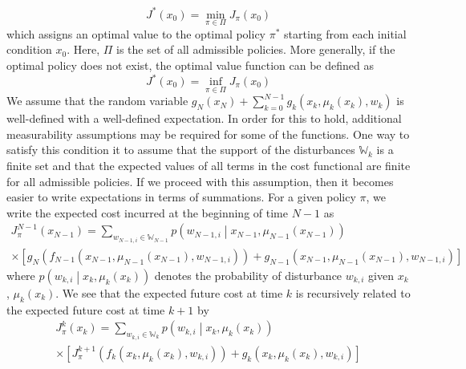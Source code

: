 \documentclass[11pt]{report} %
\begin{document}
\begin{equation}
J^{*}\left(x_{0}\right) = \min_{\pi \in \Pi}J_{\pi}\left(x_{0}\right)
\end{equation} 
which assigns an optimal value to the optimal policy $\pi^{*}$ starting from each initial condition $x_{0}$. Here, $\Pi$ is the set of all admissible policies. More generally, if the optimal policy does not exist, the optimal value function can be defined as
\begin{equation}
J^{*}\left(x_{0}\right) = \inf_{\pi \in \Pi}J_{\pi}\left(x_{0}\right)
\end{equation}
We assume that the random variable $g_{N}\left(x_{N}\right) + \sum_{k = 0}^{N - 1}g_{k}\left(x_{k}, \mu_{k}\left(x_{k}\right), w_{k}\right)$ is well-defined with a well-defined expectation. In order for this to hold, additional measurability assumptions may be required for some of the functions. One way to satisfy this condition it to assume that the support of the disturbances $\mathbb{W}_{k}$ is a finite set and that the expected values of all terms in the cost functional are finite for all admissible policies. If we proceed with this assumption, then it becomes easier to write expectations in terms of summations. For a given policy $\pi$, we write the expected cost incurred at the beginning of time $N - 1$ as
\begin{multline}
J_{\pi}^{N - 1}\left(x_{N -1}\right) = \sum_{w_{N - 1, i} \in \mathbb{W}_{N - 1}}p\left(w_{N - 1, i}\middle|x_{N - 1}, \mu_{N - 1}\left(x_{N - 1}\right)\right) \\
\times \left[g_{N}\left(f_{N - 1}\left(x_{N - 1}, \mu_{N - 1}\left(x_{N - 1}\right), w_{N - 1, i}\right)\right) + g_{N - 1}\left(x_{N - 1}, \mu_{N - 1}\left(x_{N - 1}\right), w_{N - 1, i}\right)\right]
\end{multline}
where $p\left(w_{k, i}\middle|x_{k}, \mu_{k}\left(x_{k}\right)\right)$ denotes the probability of disturbance $w_{k, i}$ given $x_{k}$, $\mu_{k}\left(x_{k}\right)$. We see that the expected future cost at time $k$ is recursively related to the expected future cost at time $k + 1$ by
\begin{multline}
J_{\pi}^{k}\left(x_{k}\right) = \sum_{w_{k, i} \in \mathbb{W}_{k}}p\left(w_{k, i}\middle|x_{k}, \mu_{k}\left(x_{k}\right)\right) \\
\times \left[J_{\pi}^{k + 1}\left(f_{k}\left(x_{k}, \mu_{k}\left(x_{k}\right), w_{k, i}\right)\right) + g_{k}\left(x_{k}, \mu_{k}\left(x_{k}\right), w_{k, i}\right)\right]
\end{multline}
\end{document}
